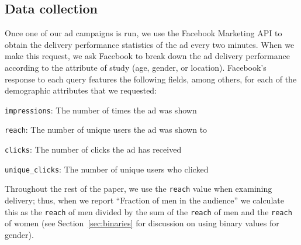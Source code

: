 \subsection{Data collection}
Once one of our ad campaigns is run, we use the Facebook Marketing API to obtain the delivery performance statistics of the ad every two minutes.
%
When we make this request, we ask Facebook to break down the ad delivery performance according to the attribute of study (age, gender, or location).
%
Facebook's response to each query features the following fields, among others, for each of the demographic attributes that we requested:
\begin{packed_itemize}
%
\item{\texttt{impressions}:} The number of times the ad was shown
%
\item{\texttt{reach}:} The number of unique users the ad was shown to
%
\item{\texttt{clicks}:} The number of clicks the ad has received
%
\item{\texttt{unique\_clicks}:} The number of unique users who clicked 
%
\end{packed_itemize}
%
Throughout the rest of the paper, we use the \texttt{reach} value when examining delivery; thus, when we report ``Fraction of men in the audience'' we calculate this as the \texttt{reach} of men divided by the sum of the \texttt{reach} of men and the \texttt{reach} of women (see Section~\ref{sec:binaries} for discussion on using binary values for gender). 
%

